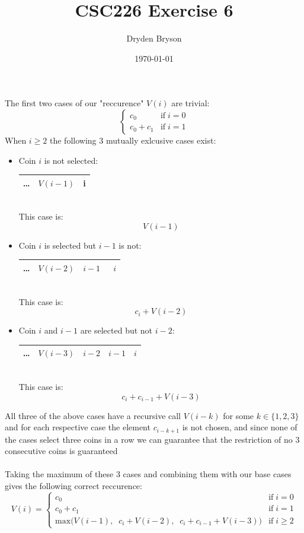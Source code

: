 \documentclass{article}
\title{CSC226 Exercise 6}
\author{Dryden Bryson}
\date{\today}
\newcommand{\cmark}{\ding{51}}%
\newcommand{\xmark}{\ding{55}}%
\begin{document}
\maketitle
\newpage
The first two cases of our "reccurence" $V(i)$ are trivial: 
$$\begin{cases}
c_{0} &\text{if}\;i=0\\
c_{0}+c_{1}&\text{if}\;i=1
\end{cases}$$
When $i \geq 2$ the following 3 mutually exlcusive cases exist: 
\begin{itemize}
    \item Coin $i$ is not selected:
    \begin{table}[htp]
    \;\;\;\;\;\;\;\;\;\begin{tabular}{|c|c|c|}
        \hline
       \dots & $V(i-1)$  &  i\;\;\xmark \\
       \hline
    \end{tabular}
    \end{table}\\
    This case is: $$V(i-1)$$

    \item Coin $i$ is selected but $i-1$ is not:
    \begin{table}[htp]
    \;\;\;\;\;\;\;\;\;\begin{tabular}{|c|c|c|c|}
        \hline
       \dots & $V(i-2)$  & $i-1$\;\;\xmark\  &  $i$\;\;\cmark \\
       \hline
    \end{tabular}
    \end{table}\\
    This case is: $$c_{i}+V(i-2)$$

    \item Coin $i$ and $i-1$ are selected but not $i-2$:
    \begin{table}[htp]
    \;\;\;\;\;\;\;\;\;\begin{tabular}{|c|c|c|c|c|}
        \hline
       \dots&  $V(i-3)$ & $i-2$\;\;\xmark & $i-1$\;\;\cmark  & $i$\;\;\cmark  \\
       \hline
    \end{tabular}
    \end{table}\\
    This case is: $$c_{i}+c_{i-1}+V(i-3)$$
\end{itemize}
All three of the above cases have a recursive call $V(i-k)$ for some $k\in \{1,2,3\}$ and for each respective case the element $c_{i-k+1}$ is not chosen, and since none of the cases select three coins in a row we can guarantee that the restriction of no 3 consecutive coins is guaranteed\\\\
Taking the maximum of these 3 cases and combining them with our base cases gives the following correct reccurence: 
$$V(i)=\begin{cases}
c_{0} &\text{if}\;i=0\\
c_{0}+c_{1}&\text{if}\;i=1\\
\text{max}\bigg(V(i-1),\;\;c_i+V(i-2),\;\;c_{i}+c_{i-1}+V(i-3)\bigg) &\text{if}\;i\geq 2
\end{cases}$$
\end{document}
